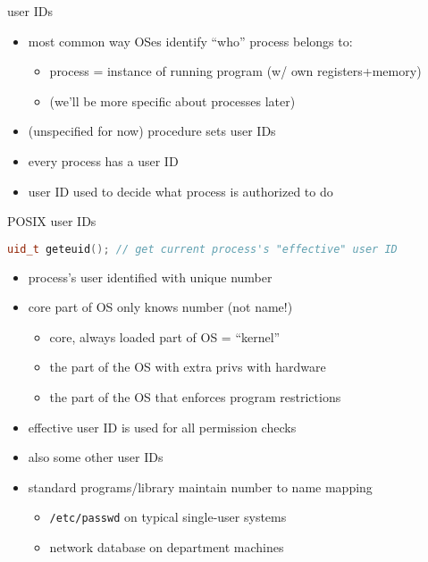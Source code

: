 \begin{frame}{user IDs}
    \begin{itemize}
    \item most common way OSes identify ``who'' process belongs to:
	\begin{itemize}
	\item process = instance of running program (w/ own registers+memory)
	\item (we'll be more specific about processes later)
	\end{itemize}
    \vspace{.5cm}
    \item (unspecified for now) procedure sets user IDs
    \item every process has a user ID
    \item user ID used to decide what process is authorized to do
    \end{itemize}
\end{frame}

\begin{frame}[fragile,label=posixUID]{POSIX user IDs}
\begin{lstlisting}[language=C++,style=small]
uid_t geteuid(); // get current process's "effective" user ID
\end{lstlisting}
\begin{itemize}
\item process's user identified with unique number
\item core part of OS only knows number (not name!)
    \begin{itemize}
    \item core, always loaded part of OS = ``kernel''
    \item the part of the OS with extra privs with hardware
    \item the part of the OS that enforces program restrictions
    \end{itemize}
\item effective user ID is used for all permission checks
\item also some other user IDs
\item<2-> standard programs/library maintain number to name mapping
    \begin{itemize}
    \item<2-> \texttt{/etc/passwd} on typical single-user systems
    \item<2-> network database on department machines
    \end{itemize}
\end{itemize}
\end{frame}
